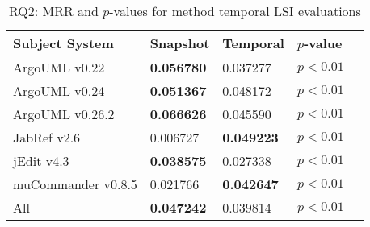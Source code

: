 
\begin{table}[t]
\renewcommand{\arraystretch}{1.3}
\footnotesize
\centering
\caption{RQ2: MRR and $p$-values for method temporal LSI evaluations}
\begin{tabular}{l|ll|ll}
   \toprule
    Subject System & Snapshot & Temporal & $p$-value  \\
    \midrule

ArgoUML v0.22 & {\bf 0.056780 } & 0.037277 & $p < 0.01$ \\
ArgoUML v0.24 & {\bf 0.051367 } & 0.048172 & $p < 0.01$ \\
ArgoUML v0.26.2 & {\bf 0.066626 } & 0.045590 & $p < 0.01$ \\
JabRef v2.6 & 0.006727 & {\bf 0.049223 } & $p < 0.01$ \\
jEdit v4.3 & {\bf 0.038575 } & 0.027338 & $p < 0.01$ \\
muCommander v0.8.5 & 0.021766 & {\bf 0.042647 } & $p < 0.01$ \\
\midrule
All & {\bf 0.047242 } & 0.039814 & $p < 0.01$ \\

    \bottomrule
\end{tabular}
\label{table:rq2:method:lsi}
\end{table}

